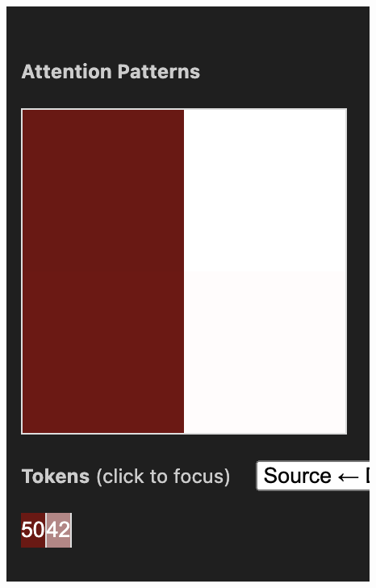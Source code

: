 \documentclass{article}
\begin{document}
\begin{center}
    \includegraphics[scale=0.4]{att_fixed2.png}

\end{center}
\end{document}
